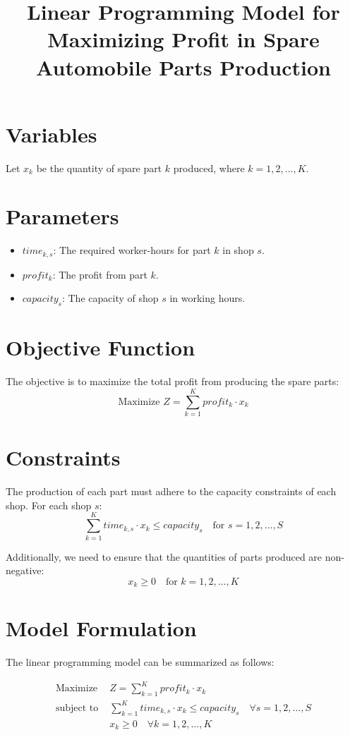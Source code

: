 \documentclass{article}
\begin{document}
\title{Linear Programming Model for Maximizing Profit in Spare Automobile Parts Production}
\author{}
\date{}
\maketitle

\section*{Variables}
Let \( x_k \) be the quantity of spare part \( k \) produced, where \( k = 1, 2, \ldots, K \).

\section*{Parameters}
\begin{itemize}
    \item \( time_{k, s} \): The required worker-hours for part \( k \) in shop \( s \).
    \item \( profit_k \): The profit from part \( k \).
    \item \( capacity_s \): The capacity of shop \( s \) in working hours.
\end{itemize}

\section*{Objective Function}
The objective is to maximize the total profit from producing the spare parts:
\[
\text{Maximize } Z = \sum_{k=1}^{K} profit_k \cdot x_k
\]

\section*{Constraints}
The production of each part must adhere to the capacity constraints of each shop. For each shop \( s \):
\[
\sum_{k=1}^{K} time_{k, s} \cdot x_k \leq capacity_s \quad \text{for } s = 1, 2, \ldots, S
\]

Additionally, we need to ensure that the quantities of parts produced are non-negative:
\[
x_k \geq 0 \quad \text{for } k = 1, 2, \ldots, K
\]

\section*{Model Formulation}
The linear programming model can be summarized as follows:

\begin{align*}
\text{Maximize } & Z = \sum_{k=1}^{K} profit_k \cdot x_k \\
\text{subject to } & \sum_{k=1}^{K} time_{k, s} \cdot x_k \leq capacity_s \quad \forall s = 1, 2, \ldots, S \\
& x_k \geq 0 \quad \forall k = 1, 2, \ldots, K
\end{align*}
\end{document}
